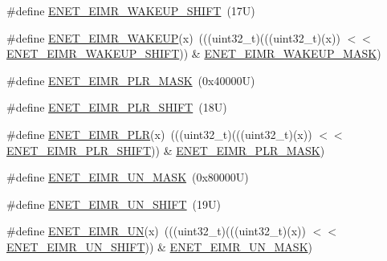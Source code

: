 \begin{DoxyCompactItemize}
\item 
\#define \mbox{\hyperlink{group___e_n_e_t___register___masks_ga1a9b8710bbb85a58d145dc2b9ad55499}{E\+N\+E\+T\+\_\+\+E\+I\+M\+R\+\_\+\+W\+A\+K\+E\+U\+P\+\_\+\+S\+H\+I\+FT}}~(17\+U)
\item 
\#define \mbox{\hyperlink{group___e_n_e_t___register___masks_ga3c5ced003888152d73863a10c53d1b47}{E\+N\+E\+T\+\_\+\+E\+I\+M\+R\+\_\+\+W\+A\+K\+E\+UP}}(x)~(((uint32\+\_\+t)(((uint32\+\_\+t)(x)) $<$$<$ \mbox{\hyperlink{group___e_n_e_t___register___masks_ga1a9b8710bbb85a58d145dc2b9ad55499}{E\+N\+E\+T\+\_\+\+E\+I\+M\+R\+\_\+\+W\+A\+K\+E\+U\+P\+\_\+\+S\+H\+I\+FT}})) \& \mbox{\hyperlink{group___e_n_e_t___register___masks_ga5a8c25f893ae181e80d0be797b4629f3}{E\+N\+E\+T\+\_\+\+E\+I\+M\+R\+\_\+\+W\+A\+K\+E\+U\+P\+\_\+\+M\+A\+SK}})
\item 
\#define \mbox{\hyperlink{group___e_n_e_t___register___masks_ga87222507fb9ff6ab830bc2547170ec28}{E\+N\+E\+T\+\_\+\+E\+I\+M\+R\+\_\+\+P\+L\+R\+\_\+\+M\+A\+SK}}~(0x40000\+U)
\item 
\#define \mbox{\hyperlink{group___e_n_e_t___register___masks_ga33f60d12aece934e2487e49ce770df3c}{E\+N\+E\+T\+\_\+\+E\+I\+M\+R\+\_\+\+P\+L\+R\+\_\+\+S\+H\+I\+FT}}~(18\+U)
\item 
\#define \mbox{\hyperlink{group___e_n_e_t___register___masks_gab758b3a72468e695aa46977e880553e1}{E\+N\+E\+T\+\_\+\+E\+I\+M\+R\+\_\+\+P\+LR}}(x)~(((uint32\+\_\+t)(((uint32\+\_\+t)(x)) $<$$<$ \mbox{\hyperlink{group___e_n_e_t___register___masks_ga33f60d12aece934e2487e49ce770df3c}{E\+N\+E\+T\+\_\+\+E\+I\+M\+R\+\_\+\+P\+L\+R\+\_\+\+S\+H\+I\+FT}})) \& \mbox{\hyperlink{group___e_n_e_t___register___masks_ga87222507fb9ff6ab830bc2547170ec28}{E\+N\+E\+T\+\_\+\+E\+I\+M\+R\+\_\+\+P\+L\+R\+\_\+\+M\+A\+SK}})
\item 
\#define \mbox{\hyperlink{group___e_n_e_t___register___masks_gaed618c09cc7404a695cd7b2b9d488c4d}{E\+N\+E\+T\+\_\+\+E\+I\+M\+R\+\_\+\+U\+N\+\_\+\+M\+A\+SK}}~(0x80000\+U)
\item 
\#define \mbox{\hyperlink{group___e_n_e_t___register___masks_ga3ca7ee192fb843e401b068f700a46880}{E\+N\+E\+T\+\_\+\+E\+I\+M\+R\+\_\+\+U\+N\+\_\+\+S\+H\+I\+FT}}~(19\+U)
\item 
\#define \mbox{\hyperlink{group___e_n_e_t___register___masks_ga867185a14b782be42efd99e8cd1f2402}{E\+N\+E\+T\+\_\+\+E\+I\+M\+R\+\_\+\+UN}}(x)~(((uint32\+\_\+t)(((uint32\+\_\+t)(x)) $<$$<$ \mbox{\hyperlink{group___e_n_e_t___register___masks_ga3ca7ee192fb843e401b068f700a46880}{E\+N\+E\+T\+\_\+\+E\+I\+M\+R\+\_\+\+U\+N\+\_\+\+S\+H\+I\+FT}})) \& \mbox{\hyperlink{group___e_n_e_t___register___masks_gaed618c09cc7404a695cd7b2b9d488c4d}{E\+N\+E\+T\+\_\+\+E\+I\+M\+R\+\_\+\+U\+N\+\_\+\+M\+A\+SK}})
$$
\end{DoxyCompactItemize}
